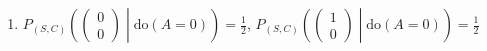 \begin{enumerate}[label=9.\arabic*]
\begin{gradedsolution}
\begin{enumerate}
            \item {} $P_{(S,C)}\left( \begin{pmatrix} 0 \\ 0 \end{pmatrix} \middle| \text{do}(A=0)\right) = \frac{1}{2}$,   $P_{(S,C)}\left( \begin{pmatrix} 1 \\ 0 \end{pmatrix} \middle| \text{do}(A=0)\right) = \frac{1}{2}$
        \end{enumerate}
    \end{gradedsolution}

\end{enumerate}


